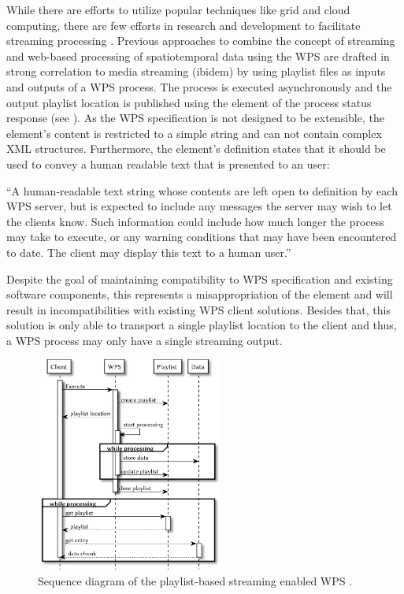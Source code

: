	While there are efforts to utilize popular techniques like grid and cloud computing, there are few efforts in research and development to facilitate streaming processing \citep{foerster2012live}. Previous approaches to combine the concept of streaming and web-based processing of spatiotemporal data using the \ac{WPS} are drafted in strong correlation to media streaming (ibidem) by using playlist files \citep{ietf:draft-pantos-http-live-streaming-12} as inputs and outputs of a \ac{WPS} process. The process is executed asynchronously and the output playlist location is published using the  element of the process status response (see ). As the \ac{WPS} specification is not designed to be extensible, the element's content is restricted to a simple string and can not contain complex \ac{XML} structures. Furthermore, the element's definition states that it should be used to convey a human readable text that is presented to an user:
	\begin{xquote}
		``A human-readable text string whose contents are left open to definition by each WPS server, but is expected to include any messages the server may wish to let the clients know. Such information could include how much longer the process may take to execute, or any warning conditions that may have been encountered to date. The client may display this text to a human user.''
	\end{xquote}
	Despite the goal of maintaining compatibility to \ac{WPS} specification and existing software components, this represents a misappropriation of the element and will result in incompatibilities with existing \ac{WPS} client solutions. Besides that, this solution is only able to transport a single playlist location to the client and thus, a \ac{WPS} process may only have a single streaming output.

	\begin{figure}[!htb]
		\centering
		\includegraphics[width=0.54225352112676062\textwidth]{figures/sequence-diagramm-previous.pdf}
		\caption{\label{fig:sd:previous}Sequence diagram of the playlist-based streaming enabled WPS \citep{foerster2012live}.}
	\end{figure}

